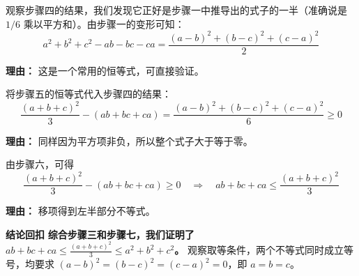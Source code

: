 \begin{proofbox}
\begin{description}[style=nextline, leftmargin=2.8em, labelsep=0.5em, itemsep=0.55em]
    \item[\textbf{步骤五（联系已证结论）：}] 观察步骤四的结果，我们发现它正好是步骤一中推导出的式子的一半（准确说是 $1/6$ 乘以平方和）。由步骤一的变形可知：
    \[
    a^2+b^2+c^2 - ab - bc - ca = \frac{(a-b)^2 + (b-c)^2 + (c-a)^2}{2}
    \]
    \par\textbf{理由：}
    这是一个常用的恒等式，可直接验证。

    \item[\textbf{步骤六（判断左半符号）：}] 将步骤五的恒等式代入步骤四的结果：
    \[
    \frac{(a+b+c)^2}{3} - (ab + bc + ca) = \frac{(a-b)^2 + (b-c)^2 + (c-a)^2}{6} \ge 0
    \]
    \par\textbf{理由：}
    同样因为平方项非负，所以整个式子大于等于零。

    \item[\textbf{步骤七（得出左不等式）：}] 由步骤六，可得
    \[
    \frac{(a+b+c)^2}{3} - (ab + bc + ca) \ge 0 \quad \Rightarrow \quad ab + bc + ca \leq \frac{(a+b+c)^2}{3}
    \]
    \par\textbf{理由：}
    移项得到左半部分不等式。
\end{description}

\medskip
\textbf{\textcolor{CProof}{结论回扣}}
\textbf{综合步骤三和步骤七，我们证明了 $ab + bc + ca \leq \frac{(a+b+c)^2}{3} \leq a^2 + b^2 + c^2$。} 观察取等条件，两个不等式同时成立等号，均要求 $(a-b)^2=(b-c)^2=(c-a)^2=0$，即 $a=b=c$。
\end{proofbox}
